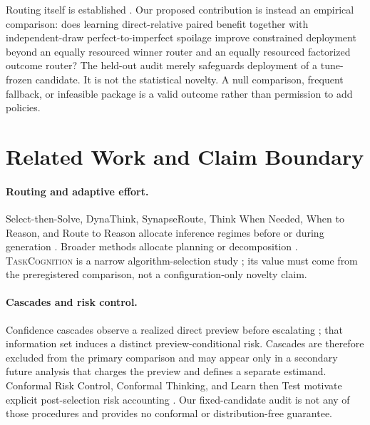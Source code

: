 \documentclass{article}
\newcommand{\TC}{\textsc{TaskCognition}}
\newcommand{\1}{\mathbb{I}}
\begin{document}
Routing itself is established \citep{pan-etal-2024-dynathink,zhou2026select,zhang2025synapseroute,guo2026think,wang2025semantic,pan2025route}. Our proposed contribution is instead an empirical comparison: does learning direct-relative paired benefit together with independent-draw perfect-to-imperfect spoilage improve constrained deployment beyond an equally resourced winner router and an equally resourced factorized outcome router? The held-out audit merely safeguards deployment of a tune-frozen candidate. It is not the statistical novelty. A null comparison, frequent fallback, or infeasible package is a valid outcome rather than permission to add policies.

\section{Related Work and Claim Boundary}
\paragraph{Routing and adaptive effort.}
Select-then-Solve, DynaThink, SynapseRoute, Think When Needed, When to Reason, and Route to Reason allocate inference regimes before or during generation \citep{zhou2026select,pan-etal-2024-dynathink,zhang2025synapseroute,guo2026think,wang2025semantic,pan2025route}. Broader methods allocate planning or decomposition \citep{yang2026ares,paglieri2025learning,liu-etal-2025-select-decompose,prasad-etal-2024-adapt}. \TC{} is a narrow algorithm-selection study \citep{rice1975algorithm}; its value must come from the preregistered comparison, not a configuration-only novelty claim.

\paragraph{Cascades and risk control.}
Confidence cascades observe a realized direct preview before escalating \citep{lu2025prolonged,lewislim2026confidence}; that information set induces a distinct preview-conditional risk. Cascades are therefore excluded from the primary comparison and may appear only in a secondary future analysis that charges the preview and defines a separate estimand. Conformal Risk Control, Conformal Thinking, and Learn then Test motivate explicit post-selection risk accounting \citep{angelopoulos2024conformal,wang2026conformal,angelopoulos2025learn}. Our fixed-candidate audit is not any of those procedures and provides no conformal or distribution-free guarantee.
\end{document}
